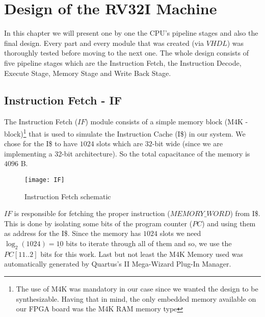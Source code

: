 \chapter{Design of the RV32I Machine}
\label{Chapter3}
	\minitoc
	\vspace{5mm}
	
	In this chapter we will present one by one the CPU's pipeline stages and also the final design. Every part and every module that was created (via $VHDL$) was thoroughly tested before moving to the next one. The whole design consists of five pipeline stages which are the Instruction Fetch, the Instruction Decode, Execute Stage, Memory Stage and Write Back Stage. 
	\clearpage
	
\section{Instruction Fetch - IF}
	 \label{Sec3.1:IF}
	 The Instruction Fetch ($IF$) module consists of a simple memory block (M4K - block)\footnote{The use of M4K was mandatory in our case since we wanted the design to be synthesizable. Having that in mind, the only embedded memory available on our FPGA board was the M4K RAM memory type } that is used to simulate the Instruction Cache (I\$) in our system. 
	 We chose for the I\$ to have $1024$ slots which are $32$-bit wide (since we are implementing a 32-bit architecture). So the total capacitance of the memory is $4096$ B. 
	 
	 \begin{figure}[h!]
	 	\begin{center}
	 		\texttt{[image: IF]}
	 		\caption{Instruction Fetch schematic}
	 		\label{Image3.1}
	 	\end{center}
	 \end{figure}
 
	 $IF$ is responsible for fetching the proper instruction ($MEMORY\_WORD$) from I\$. This is done by isolating some bits of the program counter ($PC$) and using them as address for the I\$. Since the memory has $1024$ slots we need $\log_2(1024)=\underline{10}$ bits to iterate through all of them and so, we use the $PC[11..2]$ bits for this work. Last but not least the M4K Memory used was automatically generated by Quartus's II Mega-Wizard Plug-In Manager.	

